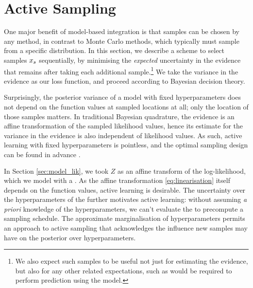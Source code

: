 \documentclass{article} %
\begin{document}
\section{Active Sampling}\label{sec:BBQ}

One major benefit of model-based integration is that samples can be chosen by any method, in contrast to Monte Carlo methods, which typically must sample from a specific distribution.  In this section, we describe a scheme to select samples $\lfv_s$ sequentially, by minimising the \textit{expected} uncertainty in the evidence that remains after taking each additional sample.\footnote{We also expect such samples to be useful not just for estimating the evidence, but also for any other related expectations, such as would be required to perform prediction using the model.} We take the variance in the evidence as our loss function, and proceed according to Bayesian decision theory.

Surprisingly, the posterior variance of a \gpb model with fixed hyperparameters does not depend on the function values at sampled locations at all; only the location of those samples matters. In traditional Bayesian quadrature, the evidence is an affine transformation of the sampled likelihood values, hence its estimate for the variance in the evidence is also independent of likelihood values. As such, active learning with fixed hyperparameters is pointless, and the optimal sampling design can be found in advance \cite{minka2000dqr}.

In Section \ref{sec:model_lik}, we took $Z$ as an affine transform of the log-likelihood, which we model with a \gp. As the affine transformation \eqref{eq:linearisation} itself depends on the function values, active learning is  desirable. The uncertainty over the hyperparameters of the \gpb further motivates active learning: without assuming \textit{a priori} knowledge of the hyperparameters, we can't evaluate the \gpb to precompute a sampling schedule. The approximate marginalisation of hyperparameters permits an approach to active sampling that acknowledges the influence new samples may have on the posterior over hyperparameters. 
 
% 
\end{document}
